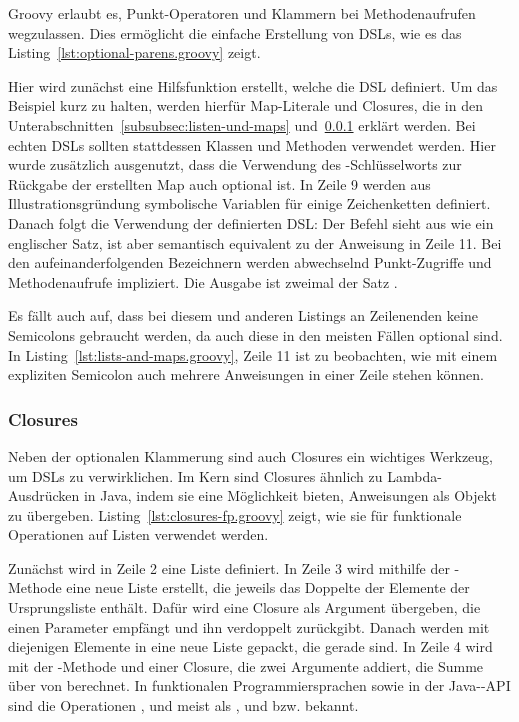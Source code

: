 Groovy erlaubt es, Punkt-Operatoren und Klammern bei Methodenaufrufen wegzulassen.
Dies ermöglicht die einfache Erstellung von DSLs, wie es das Listing~\ref{lst:optional-parens.groovy} zeigt.


Hier wird zunächst eine Hilfsfunktion  erstellt, welche die DSL definiert.
Um das Beispiel kurz zu halten, werden hierfür Map-Literale und Closures, die in den Unterabschnitten~\ref{subsubsec:listen-und-maps} und~\ref{subsubsec:closures} erklärt werden.
Bei echten DSLs sollten stattdessen Klassen und Methoden verwendet werden.
Hier wurde zusätzlich ausgenutzt, dass die Verwendung des -Schlüsselworts zur Rückgabe der erstellten Map auch optional ist.
In Zeile 9 werden aus Illustrationsgründung symbolische Variablen für einige Zeichenketten definiert.
Danach folgt die Verwendung der definierten DSL:
Der Befehl sieht aus wie ein englischer Satz, ist aber semantisch equivalent zu der Anweisung in Zeile 11.
Bei den aufeinanderfolgenden Bezeichnern werden abwechselnd Punkt-Zugriffe und Methodenaufrufe impliziert.
Die Ausgabe ist zweimal der Satz .

Es fällt auch auf, dass bei diesem und anderen Listings an Zeilenenden keine Semicolons gebraucht werden, da auch diese in den meisten Fällen optional sind.
In Listing~\ref{lst:lists-and-maps.groovy}, Zeile 11 ist zu beobachten, wie mit einem expliziten Semicolon auch mehrere Anweisungen in einer Zeile stehen können.

\subsubsection{Closures}\label{subsubsec:closures}

Neben der optionalen Klammerung sind auch Closures ein wichtiges Werkzeug, um DSLs zu verwirklichen.
Im Kern sind Closures ähnlich zu Lambda-Ausdrücken in Java, indem sie eine Möglichkeit bieten, Anweisungen als Objekt zu übergeben.
Listing~\ref{lst:closures-fp.groovy} zeigt, wie sie für funktionale Operationen auf Listen verwendet werden.


Zunächst wird in Zeile 2 eine Liste definiert.
In Zeile 3 wird mithilfe der -Methode eine neue Liste erstellt, die jeweils das Doppelte der Elemente der Ursprungsliste enthält.
Dafür wird eine Closure als Argument übergeben, die einen Parameter  empfängt und ihn verdoppelt zurückgibt.
Danach werden mit  diejenigen Elemente in eine neue Liste gepackt, die gerade sind.
In Zeile 4 wird mit der -Methode und einer Closure, die zwei Argumente addiert, die Summe über von  berechnet.
In funktionalen Programmiersprachen sowie in der Java--API sind die Operationen ,  und  meist als ,  und  bzw.  bekannt.

